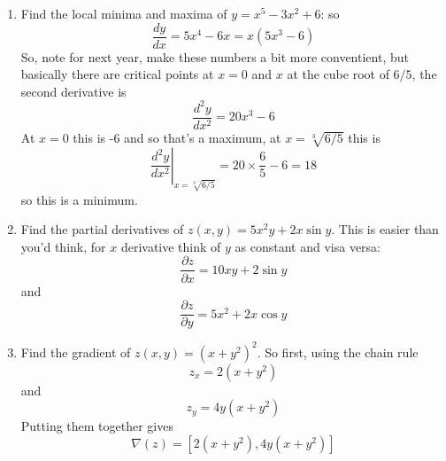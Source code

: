 \documentclass[11pt,a4paper]{scrartcl}
\begin{document}
\begin{enumerate}
\item Find the local minima and maxima of $y=x^5-3x^2+6$: so
  \begin{equation}
    \frac{dy}{dx}=5x^4-6x=x(5x^3-6)
  \end{equation}
  So, note for next year, make these numbers a bit more conventient, but basically there are critical points at $x=0$ and $x$ at the cube root of $6/5$, the second derivative is
  \begin{equation}
    \frac{d^2y}{dx^2}=20x^3-6
  \end{equation}
  At $x=0$ this is -6 and so that's a maximum, at $x=\sqrt[3]{6/5}$ this is
  \begin{equation}
    \left.\frac{d^2y}{dx^2}\right|_{x=\sqrt[3]{6/5}}=20\times\frac{6}{5}-6=18
  \end{equation}
  so this is a minimum.
  
\item Find the partial derivatives of $z(x,y)=5x^2y+2x\sin{y}$. This is easier than you'd think, for $x$ derivative think of $y$ as constant and visa versa:
  \begin{equation}
    \frac{\partial z}{\partial x}=10xy+2\sin{y}
  \end{equation}
  and
  \begin{equation}
    \frac{\partial z}{\partial y}=5x^2+2x\cos{y}
  \end{equation}

\item Find the gradient of $z(x,y)=(x+y^2)^2$. So first, using the chain rule
  \begin{equation}
    z_x=2(x+y^2)
  \end{equation}
  and
  \begin{equation}
    z_y=4y(x+y^2)
  \end{equation}
  Putting them together gives
  \begin{equation}
    \nabla(z)=[2(x+y^2),4y(x+y^2)]
  \end{equation}
  

  
\end{enumerate}
\end{document}

